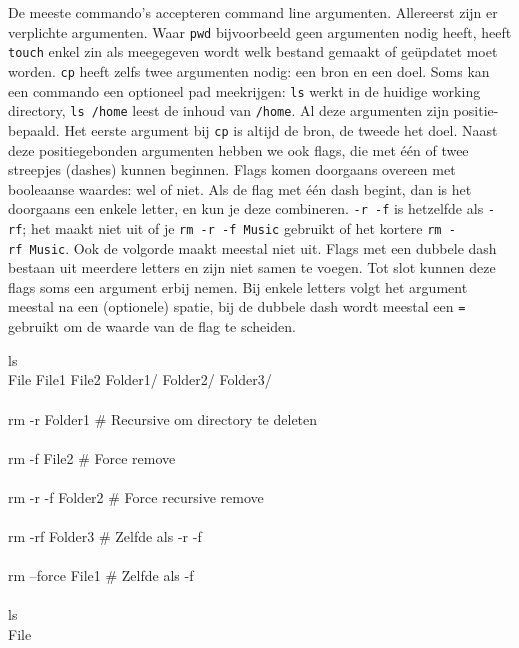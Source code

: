 De meeste commando's accepteren command line argumenten. Allereerst zijn er verplichte argumenten. Waar \texttt{pwd} bijvoorbeeld geen argumenten nodig heeft, heeft \texttt{touch} enkel zin als meegegeven wordt welk bestand gemaakt of geüpdatet moet worden. \texttt{cp} heeft zelfs twee argumenten nodig: een bron en een doel. Soms kan een commando een optioneel pad meekrijgen: \texttt{ls} werkt in de huidige working directory, \texttt{ls\ /home} leest de inhoud van \texttt{/home}. Al deze argumenten zijn positie-bepaald. Het eerste argument bij \texttt{cp} is altijd de bron, de tweede het doel. Naast deze positiegebonden argumenten hebben we ook flags, die met één of twee streepjes (dashes) kunnen beginnen. Flags komen doorgaans overeen met booleaanse waardes: wel of niet. Als de flag met één dash begint, dan is het doorgaans een enkele letter, en kun je deze combineren. \texttt{-r\ -f} is hetzelfde als \texttt{-rf}; het maakt niet uit of je \texttt{rm\ -r\ -f\ Music} gebruikt of het kortere \texttt{rm\ -rf\ Music}. Ook de volgorde maakt meestal niet uit. Flags met een dubbele dash bestaan uit meerdere letters en zijn niet samen te voegen. Tot slot kunnen deze flags soms een argument erbij nemen. Bij enkele letters volgt het argument meestal na een (optionele) spatie, bij de dubbele dash wordt meestal een \texttt{=} gebruikt om de waarde van de flag te scheiden.

\begin{bash}
\userprompt[~/Folder] ls\\
File  File1  File2  Folder1/  Folder2/ Folder3/\\
\\
\userprompt[~/Folder] rm -r Folder1    \# Recursive om directory te deleten\\
\\
\userprompt[~/Folder] rm -f File2      \# Force remove\\
\\
\userprompt[~/Folder] rm -r -f Folder2 \# Force recursive remove\\
\\
\userprompt[~/Folder] rm -rf Folder3   \# Zelfde als -r -f\\
\\
\userprompt[~/Folder] rm --force File1 \# Zelfde als -f\\
\\
\userprompt[~/Folder] ls\\
File\\
\end{bash}

